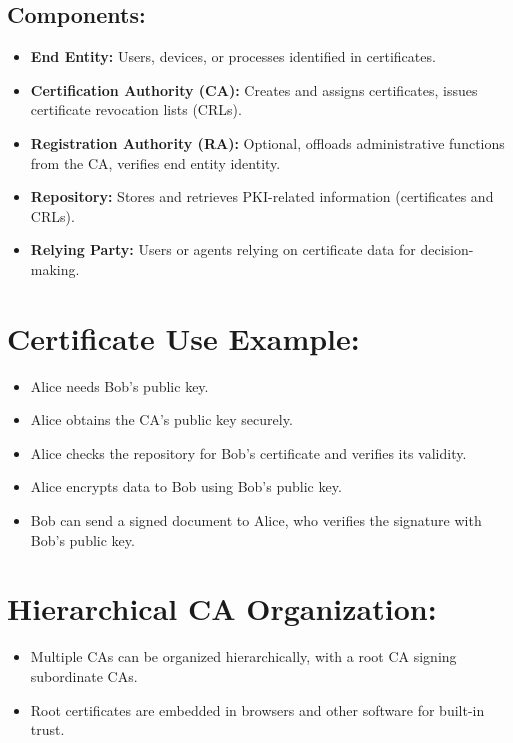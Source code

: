 \subsection{Components:}
\begin{itemize}
    \item \textbf{End Entity:} Users, devices, or processes identified in certificates.
    \item \textbf{Certification Authority (CA):} Creates and assigns certificates, issues certificate revocation lists (CRLs).
    \item \textbf{Registration Authority (RA):} Optional, offloads administrative functions from the CA, verifies end entity identity.
    \item \textbf{Repository:} Stores and retrieves PKI-related information (certificates and CRLs).
    \item \textbf{Relying Party:} Users or agents relying on certificate data for decision-making.
\end{itemize}

\section{Certificate Use Example:}
\begin{itemize}
    \item Alice needs Bob’s public key.
    \item Alice obtains the CA’s public key securely.
    \item Alice checks the repository for Bob’s certificate and verifies its validity.
    \item Alice encrypts data to Bob using Bob’s public key.
    \item Bob can send a signed document to Alice, who verifies the signature with Bob’s public key.
\end{itemize}

\section{Hierarchical CA Organization:}
\begin{itemize}
    \item Multiple CAs can be organized hierarchically, with a root CA signing subordinate CAs.
    \item Root certificates are embedded in browsers and other software for built-in trust.
\end{itemize}
